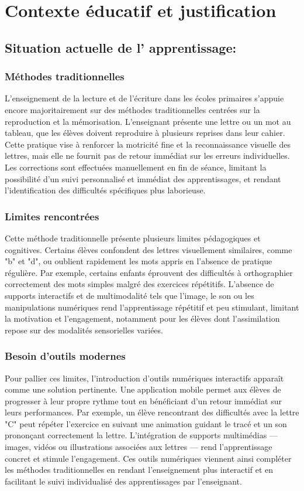 \documentclass[a4paper,oneside,12pt]{book}
\begin{document}
\chapter{Contexte éducatif et justification}\label{chap1}

\section{Situation actuelle de l' apprentissage:}
\subsection{ Méthodes traditionnelles}
L'enseignement de la lecture et de l'écriture dans les écoles primaires s'appuie encore majoritairement sur des méthodes traditionnelles centrées sur la reproduction et la mémorisation. L'enseignant présente une lettre ou un mot au tableau, que les élèves doivent reproduire à plusieurs reprises dans leur cahier. Cette pratique vise à renforcer la motricité fine et la reconnaissance visuelle des lettres, mais elle ne fournit pas de retour immédiat sur les erreurs individuelles. Les corrections sont effectuées manuellement en fin de séance, limitant la possibilité d'un suivi personnalisé et immédiat des apprentissages, et rendant l'identification des difficultés spécifiques plus laborieuse.
\subsection{ Limites rencontrées }
Cette méthode traditionnelle présente plusieurs limites pédagogiques et cognitives. Certains élèves confondent des lettres visuellement similaires, comme "b" et "d", ou oublient rapidement les mots appris en l'absence de pratique régulière. Par exemple, certains enfants éprouvent des difficultés à orthographier correctement des mots simples malgré des exercices répétitifs. L'absence de supports interactifs et de multimodalité  tels que l'image, le son ou les manipulations numériques  rend l'apprentissage répétitif et peu stimulant, limitant la motivation et l'engagement, notamment pour les élèves dont l'assimilation repose sur des modalités sensorielles variées.
\subsection{Besoin d'outils modernes }
Pour pallier ces limites, l'introduction d'outils numériques interactifs apparaît comme une solution pertinente. Une application mobile permet aux élèves de progresser à leur propre rythme tout en bénéficiant d'un retour immédiat sur leurs performances. Par exemple, un élève rencontrant des difficultés avec la lettre "C" peut répéter l'exercice en suivant une animation guidant le tracé et un son prononçant correctement la lettre. L'intégration de supports multimédias — images, vidéos ou illustrations associées aux lettres — rend l'apprentissage concret et stimule l'engagement. Ces outils numériques viennent ainsi compléter les méthodes traditionnelles en rendant l'enseignement plus interactif et en facilitant le suivi individualisé des apprentissages par l'enseignant. 
	
\end{document}
